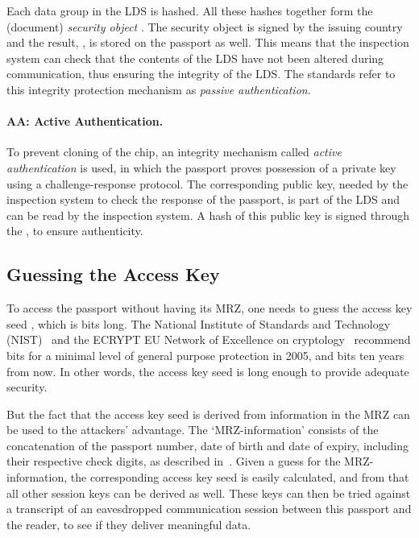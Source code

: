 \documentclass[runningheads,envcountsame,envcountsect,oribibl]{llncs}
\begin{document}
Each data group in the LDS is hashed. All these hashes together form
the (document) \emph{security object} . The security object
is signed by the issuing country and the result, , is stored on
the passport as well. This means that
the inspection system can check that the contents of the LDS have not been
altered during communication, thus ensuring the integrity of the LDS. The
standards refer to this integrity protection mechanism as
\emph{passive authentication}.

\paragraph{AA: Active Authentication.}

To prevent cloning of the chip, an integrity mechanism called
\emph{active authentication} is used, in which the passport
proves possession of a private key  using a
challenge-response
protocol. The corresponding public key, needed by the inspection
system to check the response of the passport, is part of the LDS
and can be read by the inspection system. A hash of this public
key is signed through the , to ensure authenticity. 



\subsection{Guessing the Access Key}
\label{subsec-guess}


To access the passport without having its MRZ, one needs to guess the access
key seed , which is  bits long.  The National Institute
of Standards and Technology (NIST)~\cite{nist-keys} and the ECRYPT EU Network
of Excellence on cryptology~\cite{ecrypt-keylength} recommend  bits for a
minimal level of general purpose protection in 2005, and  bits ten years
from now.  In other words, the access key seed is long enough to provide
adequate security.

But the fact that the access key seed is derived from information in the MRZ can be
used to the attackers' advantage.  The `MRZ-information'
consists of the concatenation of the passport number, date of birth
and date of expiry, including their respective check digits, as described
in~\cite{icao03:doc9303}. Given a guess for the MRZ-information, the
corresponding access key seed  is easily calculated, and from
that all other session keys can be derived as well. These keys can then be
tried against a transcript of an eavesdropped communication session between
this passport and the reader, to see if they deliver meaningful data. 
\end{document}
